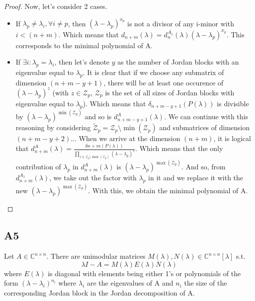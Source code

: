 \documentclass[11pt]{article}
\begin{document}
\begin{proof}
 Now, let's consider 2 cases.
 \begin{itemize}
 \item If $\lambda_p \neq \lambda_i , \forall i\neq p$, then $(\lambda - \lambda_p)^{x_p}$ is not a divisor of any i-minor with $i < (n+m)$. Which means that $d_{n+m}(\lambda) = d_{n}^{A_1}(\lambda) (\lambda - \lambda_p)^{x_p}$. This corresponds to the minimal polynomial of A.
 \item If $\exists i : \lambda_p = \lambda_i$, then let's denote $y$ as the number of Jordan blocks with an eigenvalue equal to $\lambda_p$. It is clear that if we choose any submatrix of dimension $(n+m-y+1)$, there will be at least one occurence of $(\lambda - \lambda_p)^{z}$ (with $ z \in \mathcal{Z}_p$, $\mathcal{Z}_p$ is the set of all sizes of Jordan blocks with eigenvalue equal to $\lambda_p$). Which means that $\delta_{n+m-y+1} (P(\lambda))$ is divisible by $(\lambda - \lambda_p)^{\min(\mathcal{Z}_p)}$ and so is $d_{n+m-y+1}^{A}(\lambda)$. We can continue with this reasoning by considering  $\tilde{\mathcal{Z}}_p =  \mathcal{Z}_p \setminus \min(\mathcal{Z}_p)$ and submatrices of dimension $(n+m-y+2)$... When we arrive at the dimension $(n+m)$, it is logical that $d_{n+m}^{A}(\lambda) = \frac{\delta{n+m}(P(\lambda))}{\prod_{z \in \mathcal{Z}_p\setminus \max{(\mathcal{Z}_p)}}(\lambda - \lambda_p)^{z}}$. Which means that the only contribution of $\lambda_p$ in $d_{n+m}^{A}(\lambda)$ is $(\lambda - \lambda_p)^{\max(\mathcal{Z}_p)}$. And so, from $d_{n+m}^{A_1}(\lambda)$, we take out the factor with $\lambda_p$ in it and we replace it with the new $(\lambda - \lambda_p)^{\max(\mathcal{Z}_p)}$. With this, we obtain the minimal polynomial of A.
 \end{itemize}
\end{proof}
\subsection*{A5}
Let $A\in \mathbb{C}^{n\times n}$. There are unimodular matrices $M(\lambda), N(\lambda) \in \mathbb{C}^{n\times n}[\lambda]$ s.t. 
\[\lambda I - A = M(\lambda)E(\lambda)N(\lambda)
\] where $E(\lambda)$ is diagonal with elements being either 1's or polynomials of the form $(\lambda - \lambda_i)^{n_i}$ where $ \lambda_i$ are the eigenvalues of A and $n_i$ the size of the corresponding Jordan block in the Jordan decomposition of A.
\end{document}
